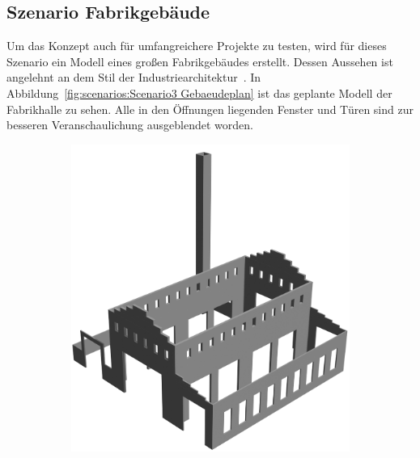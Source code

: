 \subsection{Szenario Fabrikgebäude}\label{scenarios:scenario3}
Um das Konzept auch für umfangreichere Projekte zu testen, wird für dieses Szenario ein Modell eines großen Fabrikgebäudes erstellt.
Dessen Aussehen ist angelehnt an dem Stil der Industriearchitektur~\cite{Industriearchitektur}.
In Abbildung~\ref{fig:scenarios:Scenario3 Gebaeudeplan} ist das geplante Modell der Fabrikhalle zu sehen.
Alle in den Öffnungen liegenden Fenster und Türen sind zur besseren Veranschaulichung ausgeblendet worden.
\begin{figure}[hb!]
  \begin{subfigure}[b]{0.49\columnwidth}
    \includegraphics[width=\columnwidth]{fig/scenario3_render_ifc.png}
  \end{subfigure}
  \hfill
  \begin{subfigure}[b]{0.49\columnwidth}

\end{subfigure}
\end{figure}
